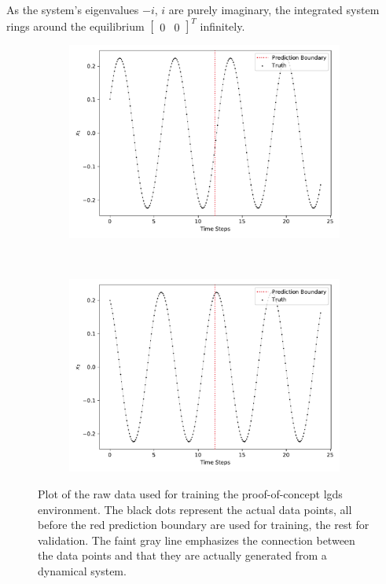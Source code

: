 		As the system's eigenvalues \( -i \), \( i \) are purely imaginary, the integrated system rings around the equilibrium \( \begin{bmatrix} 0 & 0 \end{bmatrix}^T \) infinitely.

		\begin{figure}
			\centering
			\begin{subfigure}{0.5\linewidth}
				\centering
				\includegraphics[width=\linewidth]{figures/experiments/environments/observations-lgds-N0-D0.pdf}
			\end{subfigure}%
			~
			\begin{subfigure}{0.5\linewidth}
				\centering
				\includegraphics[width=\linewidth]{figures/experiments/environments/observations-lgds-N0-D1.pdf}
			\end{subfigure}
			\caption{Plot of the raw data used for training the proof-of-concept \ac{lgds} environment. The black dots represent the actual data points, all before the red prediction boundary are used for training, the rest for validation. The faint gray line emphasizes the connection between the data points and that they are actually generated from a dynamical system.}
			\label{fig:envLgds}
		\end{figure}

